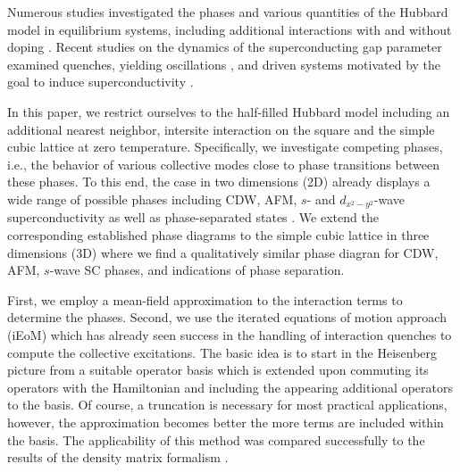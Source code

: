 \documentclass[
    reprint, 
    aps,
    preprintnumbers,
    twocolumn,
    prb,
    superscriptaddress
]{revtex4-2}
\begin{document}
Numerous studies investigated the phases and various quantities of the Hubbard model in equilibrium systems, including additional interactions with and without doping
\cite{Micnas88,Micnas88b,Micnas89,Dzierzawa92,Kostyrko92,Eriksson95,Staudt00,Onari04,Toschi05,Brackett16,Paki19,romer20,Sushchyev22}. 
Recent studies on the dynamics of the superconducting gap parameter examined quenches, yielding oscillations \cite{Volkov73,Yuzbashyan05,Yuzbashyan06,Barankov06,Cui19}, 
and driven systems motivated by the goal to induce superconductivity \cite{Nicoletti14,Krull14,Moor14,Casandruc15,patel16,sentef17,Buenemann17}.

In this paper, we restrict ourselves to the half-filled Hubbard model 
including an additional nearest neighbor, intersite interaction on the square and the simple cubic lattice at zero temperature.
Specifically, we investigate competing phases, i.e., the behavior of various collective modes close to phase transitions between these phases.
To this end, the case in two dimensions (2D) already displays a wide range of possible phases
including CDW, AFM, $s$- and $d_{x^2 - y^2}$-wave superconductivity as well as 
phase-separated states \cite{Micnas88b,Tsuchiura95,Su01,Su04,ha11,Huang13,Jiang22,Linner23}.
We extend the corresponding established phase diagrams to the simple cubic lattice in three dimensions
(3D) where we find a qualitatively similar phase diagran for CDW, AFM, $s$-wave SC phases, and
indications of phase separation.

First, we employ a mean-field approximation to the interaction terms to determine the phases.
Second, we use the iterated equations of motion approach (iEoM)
which has already seen success in the handling of interaction quenches \cite{uhrig09,hamerla13,hamerla14,bleicker18}
to compute the collective excitations.
The basic idea is to start in the Heisenberg picture from a suitable operator basis which is extended
upon commuting its operators with the Hamiltonian and including the appearing additional operators to the basis. 
Of course, a truncation is necessary for most practical applications, however, the approximation becomes better the more terms are included within the basis.
The applicability of this method was compared successfully to the results of the density matrix formalism \cite{Kalthoff17}.
\end{document}
